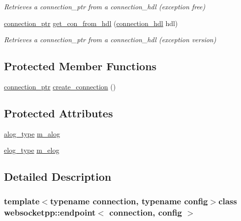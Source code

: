 \begin{DoxyCompactItemize}
\begin{DoxyCompactList}\small\item\em Retrieves a connection\+\_\+ptr from a connection\+\_\+hdl (exception free) \end{DoxyCompactList}\item 
\hyperlink{classwebsocketpp_1_1endpoint_aa90d289d870c500be228ee1dea75b8b2}{connection\+\_\+ptr} \hyperlink{classwebsocketpp_1_1endpoint_a7be6f2e7dc3901dd577eae33dfd2df24}{get\+\_\+con\+\_\+from\+\_\+hdl} (\hyperlink{namespacewebsocketpp_a6b3d26a10ee7229b84b776786332631d}{connection\+\_\+hdl} hdl)
\begin{DoxyCompactList}\small\item\em Retrieves a connection\+\_\+ptr from a connection\+\_\+hdl (exception version) \end{DoxyCompactList}\end{DoxyCompactItemize}
\subsection*{Protected Member Functions}
\begin{DoxyCompactItemize}
\item 
\hyperlink{classwebsocketpp_1_1endpoint_aa90d289d870c500be228ee1dea75b8b2}{connection\+\_\+ptr} \hyperlink{classwebsocketpp_1_1endpoint_abfbee4cb244700560ef80594a913cd95}{create\+\_\+connection} ()
\end{DoxyCompactItemize}
\subsection*{Protected Attributes}
\begin{DoxyCompactItemize}
\item 
\hyperlink{classwebsocketpp_1_1endpoint_a1ca2ad5bfdd241a031746c3f158f4003}{alog\+\_\+type} \hyperlink{classwebsocketpp_1_1endpoint_ab77acb19adafe52f5c28aa387077cfbc}{m\+\_\+alog}
\item 
\hyperlink{classwebsocketpp_1_1endpoint_a4ab98f4fed5b5b2740105eff732c7b1e}{elog\+\_\+type} \hyperlink{classwebsocketpp_1_1endpoint_a46d6afb6f4f1541da167230c8c1e6f9a}{m\+\_\+elog}
\end{DoxyCompactItemize}


\subsection{Detailed Description}
\subsubsection*{template$<$typename connection, typename config$>$class websocketpp\+::endpoint$<$ connection, config $>$}

